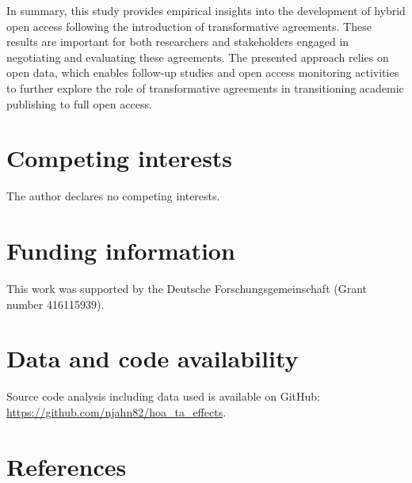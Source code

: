 \documentclass[a4paper,man,floatsintext,longtable,noextraspace,12pt]{apa6}
\begin{document}
In summary, this study provides empirical insights into the development
of hybrid open access following the introduction of transformative
agreements. These results are important for both researchers and
stakeholders engaged in negotiating and evaluating these agreements. The
presented approach relies on open data, which enables follow-up studies
and open access monitoring activities to further explore the role of
transformative agreements in transitioning academic publishing to full
open access.

\section{Competing interests}\label{competing-interests}

The author declares no competing interests.

\section{Funding information}\label{funding-information}

This work was supported by the Deutsche Forschungsgemeinschaft (Grant
number 416115939).

\section{Data and code availability}\label{data-and-code-availability}

Source code analysis including data used is available on GitHub:
\url{https://github.com/njahn82/hoa_ta_effects}.

\section*{References}\label{references}
\end{document}
